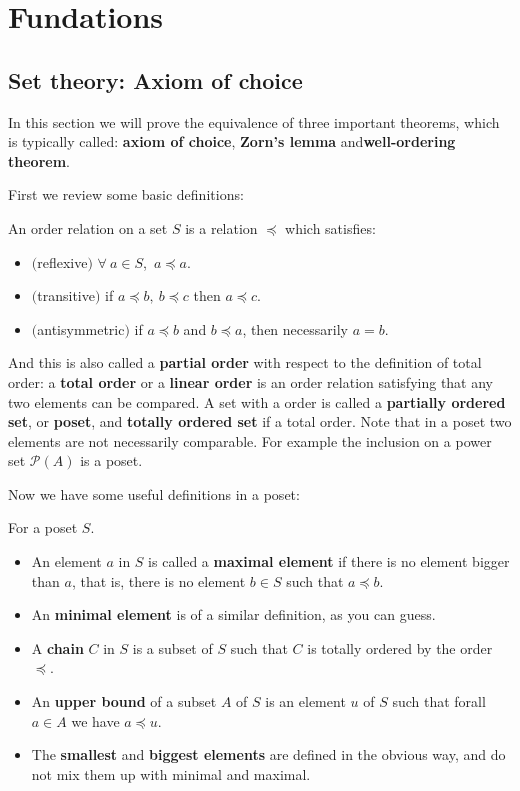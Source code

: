 \chapter{Fundations}	
\section{Set theory: Axiom of choice}
In this section we will prove the equivalence of three important theorems, which is typically called: \textbf{axiom of choice}, \textbf{Zorn's lemma} and\textbf{well-ordering theorem}.\par
First we review some basic definitions:
\begin{definition}
	An order relation on a set $S$ is a relation $\preceq$ which satisfies:
	\begin{itemize}
		\item$($reflexive$)$ $\forall\ a\in S$,\ $a\preceq a$.
		\item$($transitive$)$ if $a\preceq b,\ b\preceq c $ then $a\preceq c$.
		\item$($antisymmetric$)$ if $a\preceq b$ and $b\preceq a$, then necessarily $a=b$.
	\end{itemize}
\end{definition}
And this is also called a \textbf{partial order} with respect to the definition of total order: a \textbf{total order} or a \textbf{linear order} is an order relation satisfying that any two elements can be compared. A set with a order is called a \textbf{partially ordered set}, or \textbf{poset}, and \textbf{totally ordered set} if a total order. Note that in a poset two elements are not necessarily comparable. For example the inclusion on a power set $\mathscr{P}(A)$ is a poset.\par
Now we have some useful definitions in a poset:
\begin{definition}
	For a poset $S$.
	\begin{itemize}
		\item An element $a$ in $S$ is called a \textbf{maximal element} if 
		there is no element bigger than $a$, that is, there is no element $b\in S$ such that $a\preceq b$.
		\item An \textbf{minimal element} is of a similar definition, as you can guess.
		\item A \textbf{chain} $C$ in $S$ is a subset of $S$ such that $C$ is totally ordered by the order $\preceq$.
		\item An \textbf{upper bound} of a subset $A$ of $S$ is an element $u$ of $S$ such that forall $a\in A$ we have $a\preceq u$.
		\item The \textbf{smallest} and \textbf{biggest elements} are defined in the obvious way, and do not mix them up with minimal and maximal.
	\end{itemize}
\end{definition}
